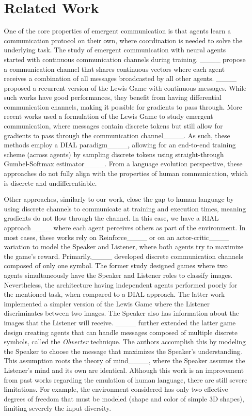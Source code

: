 \section{Related Work}
\label{app:rw}
One of the core properties of emergent communication is that agents learn a communication protocol on their own, where coordination is needed to solve the underlying task. The study of emergent communication with neural agents started with continuous communication channels during training. ____ propose a communication channel that shares continuous vectors where each agent receives a combination of all messages broadcasted by all other agents. ____ proposed a recurrent version of the Lewis Game with continuous messages. While such works have good performances, they benefit from having differential communication channels, making it possible for gradients to pass through. More recent works used a formulation of the Lewis Game to study emergent communication, where messages contain discrete tokens but still allow for gradients to pass through the communication channel____. As such, these methods employ a DIAL paradigm____, allowing for an end-to-end training scheme (across agents) by sampling discrete tokens using straight-through Gumbel-Softmax estimator____. From a language evolution perspective, these approaches do not fully align with the properties of human communication, which is discrete and undifferentiable.

Other approaches, similarly to our work, close the gap to human language by using discrete channels to communicate at training and execution times, meaning gradients do not flow through the channel. In this case, we have a RIAL approach____ where each agent perceives others as part of the environment. In most cases, these works rely on Reinforce____ or on an actor-critic____ variation to model the Speaker and Listener, where both agents try to maximize the game's reward. Primarily,____ developed discrete communication channels composed of only one symbol. The former study designed games where two agents simultaneously have the Speaker and Listener roles to classify images. Nevertheless, the architecture having independent agents performed poorly for the mentioned task, when compared to a DIAL approach. The latter work implemented a simpler version of the Lewis Game where the Listener discriminates between two images. The Speaker also has information about the images that the Listener will receive. ____ further extended the latter game design creating agents that can handle messages composed of multiple discrete symbols, called the \textit{Obverter} technique. The authors accomplish this by modeling the Speaker to choose the message that maximizes the Speaker's understanding. This assumption roots the theory of mind____, where the Speaker assumes the Listener's mind and its own are identical. Although this work is an improvement from past works regarding the emulation of human language, there are still severe limitations. For example, the environment considered has only two effective degrees of freedom that must be modeled (shape and color of simple 3D shapes), limiting severely the input diversity.

